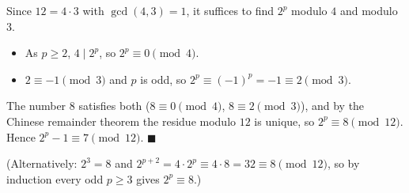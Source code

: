 Since $12=4\cdot3$ with $\gcd(4,3)=1$, it suffices to find $2^p$ modulo $4$ and modulo $3$.
\begin{itemize}
\item As $p\ge2$, $4\mid2^p$, so $2^p\equiv0\pmod4$.
\item $2\equiv-1\pmod3$ and $p$ is odd, so $2^p\equiv(-1)^p=-1\equiv2\pmod3$.
\end{itemize}
The number $8$ satisfies both ($8\equiv0\pmod4$, $8\equiv2\pmod3$), and by the Chinese remainder theorem the residue modulo $12$ is unique, so $2^p\equiv8\pmod{12}$. Hence $2^p-1\equiv7\pmod{12}$. $\blacksquare$

(Alternatively: $2^3=8$ and $2^{p+2}=4\cdot2^p\equiv4\cdot8=32\equiv8\pmod{12}$, so by induction every odd $p\ge3$ gives $2^p\equiv8$.)
